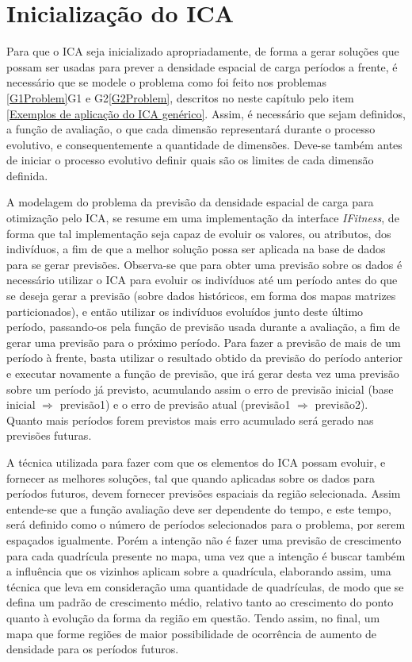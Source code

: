 \section{Inicialização do ICA}
\label{Inicialização do ICA}

Para que o ICA seja inicializado apropriadamente, de forma a gerar soluções que possam ser usadas para prever a densidade espacial de carga períodos a frente, é necessário que se modele o problema como foi feito nos problemas \ref{G1Problem}G1 e G2\ref{G2Problem}, descritos no neste capítulo pelo item \ref{Exemplos de aplicação do ICA genérico}. Assim, é necessário que sejam definidos, a função de avaliação, o que cada dimensão representará durante o processo evolutivo, e consequentemente a quantidade de dimensões. Deve-se também antes de iniciar o processo evolutivo definir quais são os limites de cada dimensão definida.

A modelagem do problema da previsão da densidade espacial de carga para otimização pelo ICA, se resume em uma implementação da interface \emph{IFitness}, de forma que tal implementação seja capaz de evoluir os valores, ou atributos, dos indivíduos, a fim de que a melhor solução possa ser aplicada na base de dados para se gerar previsões. Observa-se que para obter uma previsão sobre os dados é necessário utilizar o ICA para evoluir os indivíduos até um período antes do que se deseja gerar a previsão (sobre dados históricos, em forma dos mapas matrizes particionados), e então utilizar os indivíduos evoluídos junto deste último período, passando-os pela função de previsão usada durante a avaliação, a fim de gerar uma previsão para o próximo período. Para fazer a previsão de mais de um período à frente, basta utilizar o resultado obtido da previsão do período anterior e executar novamente a função de previsão, que irá gerar desta vez uma previsão sobre um período já previsto, acumulando assim o erro de previsão inicial (base inicial \(\Rightarrow\) previsão1) e o erro de previsão atual (previsão1 \(\Rightarrow\) previsão2). Quanto mais períodos forem previstos mais erro acumulado será gerado nas previsões futuras.

A técnica utilizada para fazer com que os elementos do ICA possam evoluir, e fornecer as melhores soluções, tal que quando aplicadas sobre os dados para períodos futuros, devem fornecer previsões espaciais da região selecionada. Assim  entende-se que a função avaliação deve ser dependente do tempo, e este tempo, será definido como o número de períodos selecionados para o problema, por serem espaçados igualmente. Porém a intenção não é fazer uma previsão de crescimento para cada quadrícula presente no mapa, uma vez que a intenção é buscar também a influência que os vizinhos aplicam sobre a quadrícula, elaborando assim, uma técnica que leva em consideração uma quantidade de quadrículas, de modo que se defina um padrão de crescimento médio, relativo tanto ao crescimento do ponto quanto à evolução da forma da região em questão. Tendo assim, no final, um mapa que forme regiões de maior possibilidade de ocorrência de aumento de densidade para os períodos futuros.

